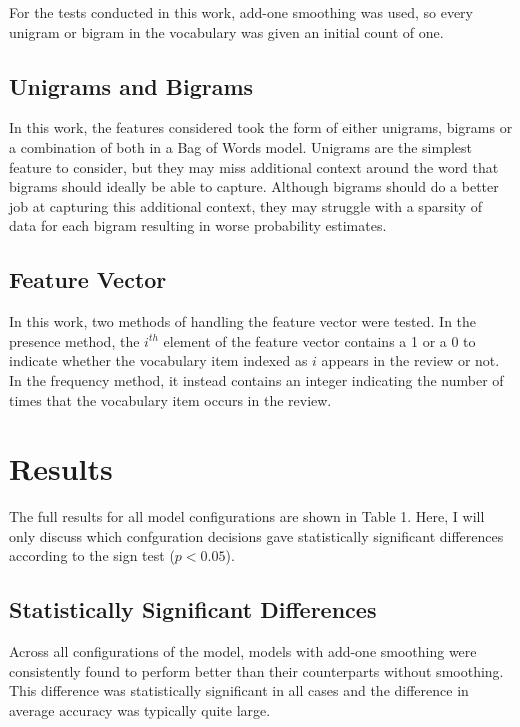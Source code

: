 \documentclass[twocolumn]{article}
\begin{document}
For the tests conducted in this work, add-one smoothing was used, so every unigram or bigram in the vocabulary was given an initial count of one.

\subsection{Unigrams and Bigrams}

In this work, the features considered took the form of either unigrams, bigrams or a combination of both in a Bag of Words model. Unigrams are the simplest feature to consider, but they may miss additional context around the word that bigrams should ideally be able to capture. Although bigrams should do a better job at capturing this additional context, they may struggle with a sparsity of data for each bigram resulting in worse probability estimates.

\subsection{Feature Vector}

In this work, two methods of handling the feature vector were tested. In the presence method, the $i^{th}$ element of the feature vector contains a 1 or a 0 to indicate whether the vocabulary item indexed as $i$ appears in the review or not. In the frequency method, it instead contains an integer indicating the number of times that the vocabulary item occurs in the review.

\section{Results}

The full results for all model configurations are shown in Table 1. Here, I will only discuss which confguration decisions gave statistically significant differences according to the sign test ($p < 0.05$).

\subsection{Statistically Significant Differences}

Across all configurations of the model, models with add-one smoothing were consistently found to perform better than their counterparts without smoothing. This difference was statistically significant in all cases and the difference in average accuracy was typically quite large.
\end{document}
